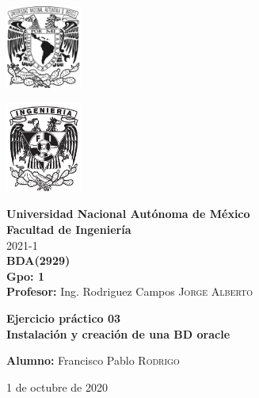 \documentclass{article}
\newcommand{\materia}{BDA}
\newcommand{\clave}{2929}
\newcommand{\profesor}{Ing. Rodriguez Campos \textsc{Jorge Alberto}}
\newcommand{\semestre}{2021-1}
\newcommand{\alumno}{Francisco Pablo \textsc{Rodrigo}}
\newcommand{\actividad}{Ejercicio práctico 03}
\newcommand{\titulo}{Instalación y creación de una BD oracle}
\newcommand{\fechaEntrega}{1 de octubre de 2020}
\begin{document}
\thispagestyle{empty}
\begin{minipage}[t][5cm][t]{0.2\linewidth}
    \includegraphics[width=2.5cm]{unam.jpg}
    \vspace{10cm}

    \includegraphics[width=2.5cm]{fiblack}
\end{minipage}
\begin{minipage}[t]{0.7\linewidth}
    \vspace{-2.5cm}
    \LARGE{\textbf{Universidad Nacional Autónoma de México}}\\
    \Large{\textbf{Facultad de Ingeniería}} \\

    \large{\semestre}\\[2cm]

    \large{\textbf{\materia (\clave)}}\\
    \large{\textbf{Gpo: 1}}\\[5mm]
    \large{\textbf{Profesor:} \profesor}\\ [1.5cm]
    \begin{center}
        \LARGE{\textbf{\actividad}}\\
        \LARGE{\textbf{\titulo}}\\
    \end{center}

    \vspace{3.3cm}

    \large{\textbf{Alumno:} \alumno} \\[1.5cm]

    \begin{flushright}
        \fechaEntrega%
    \end{flushright}
\end{minipage}

\newpage
\end{document}
